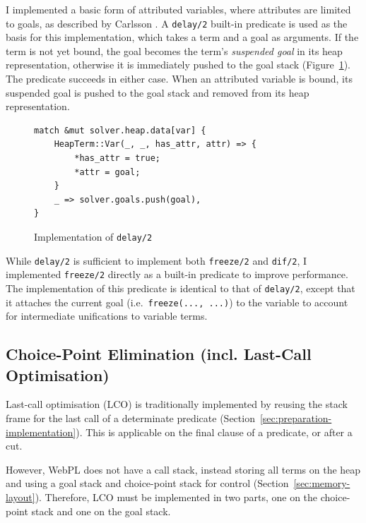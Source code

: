 I implemented a basic form of attributed variables, where attributes are limited to goals, as described by Carlsson \cite{carlssonimplementationdiffreeze1986}. A \texttt{delay/2} built-in predicate is used as the basis for this implementation, which takes a term and a goal as arguments. If the term is not yet bound, the goal becomes the term's \emph{suspended goal} in its heap representation, otherwise it is immediately pushed to the goal stack (Figure~\ref{fig:delay-impl}). The predicate succeeds in either case. When an attributed variable is bound, its suspended goal is pushed to the goal stack and removed from its heap representation.

\begin{figure}[H]
\centering
\begin{verbatim}
match &mut solver.heap.data[var] {
    HeapTerm::Var(_, _, has_attr, attr) => {
        *has_attr = true;
        *attr = goal;
    }
    _ => solver.goals.push(goal),
}
\end{verbatim}
\caption{Implementation of \texttt{delay/2}}
\label{fig:delay-impl}
\end{figure}

While \texttt{delay/2} is sufficient to implement both \texttt{freeze/2} and \texttt{dif/2}, I implemented \texttt{freeze/2} directly as a built-in predicate to improve performance. The implementation of this predicate is identical to that of \texttt{delay/2}, except that it attaches the current goal (i.e.\ \texttt{freeze(..., ...)}) to the variable to account for intermediate unifications to variable terms.

\subsection{Choice-Point Elimination (incl. Last-Call Optimisation)}

\label{sec:choice-point-elimination}

Last-call optimisation (LCO) is traditionally implemented by reusing the stack frame for the last call of a determinate predicate (Section~\ref{sec:preparation-implementation}). This is applicable on the final clause of a predicate, or after a cut.

However, WebPL does not have a call stack, instead storing all terms on the heap and using a goal stack and choice-point stack for control (Section~\ref{sec:memory-layout}). Therefore, LCO must be implemented in two parts, one on the choice-point stack and one on the goal stack.

